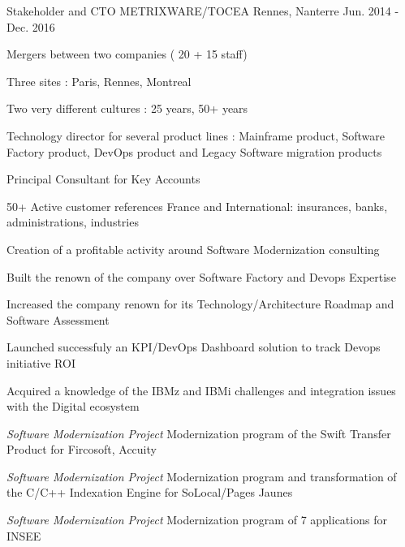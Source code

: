 \begin{cventries}
    \cventry
    {Stakeholder and CTO} %
    {METRIXWARE/TOCEA} %
    {Rennes, Nanterre} %
    {Jun. 2014 - Dec. 2016} %
    {
        \experience
        {
            \begin{cvitems} %
                \item{Mergers between two companies ( 20 + 15 staff)}
                \item{Three sites : Paris, Rennes, Montreal}
                \item{Two very different cultures : 25 years, 50+ years}
                \item{Technology director for several product lines : Mainframe product, Software Factory product, DevOps product and Legacy Software migration products}
                \item{Principal Consultant for Key Accounts}
                \item{50+ Active customer references France and International: insurances, banks, administrations, industries}
            \end{cvitems}
        }
        {
           \begin{cvitems} %
            \item{ Creation of a profitable activity around Software Modernization consulting}
            \item{ Built the renown of the company over Software Factory and Devops Expertise}
            \item{ Increased the company renown for its Technology/Architecture Roadmap and Software Assessment}
            \item{ Launched successfuly an KPI/DevOps Dashboard solution to track Devops initiative ROI}              
            \item{ Acquired a knowledge of the IBMz and IBMi challenges and integration issues with the Digital ecosystem}
            \item{\emph{Software Modernization Project} Modernization program of the Swift Transfer Product for Fircosoft, Accuity}
            \item{\emph{Software Modernization Project} Modernization program and transformation of the C/C++ Indexation Engine for SoLocal/Pages Jaunes}
            \item{\emph{Software Modernization Project} Modernization program of 7 applications for INSEE}

\end{cvitems}}}
\end{cventries}
